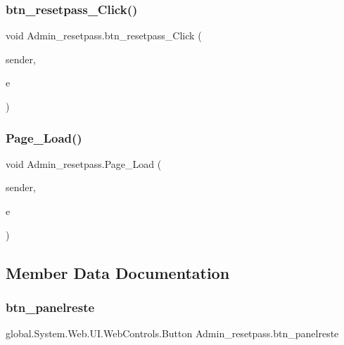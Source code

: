 \subsubsection{\texorpdfstring{btn\_resetpass\_Click()}{btn\_resetpass\_Click()}}
{\footnotesize\ttfamily void Admin\+\_\+resetpass.\+btn\+\_\+resetpass\+\_\+\+Click (\begin{DoxyParamCaption}\item[{object}]{sender,  }\item[{Event\+Args}]{e }\end{DoxyParamCaption})\hspace{0.3cm}{\ttfamily [protected]}}

\mbox{\label{class_admin__resetpass_a158be149b7919c7145f6ab7c6acb3ed6}} 
\subsubsection{\texorpdfstring{Page\_Load()}{Page\_Load()}}
{\footnotesize\ttfamily void Admin\+\_\+resetpass.\+Page\+\_\+\+Load (\begin{DoxyParamCaption}\item[{object}]{sender,  }\item[{Event\+Args}]{e }\end{DoxyParamCaption})\hspace{0.3cm}{\ttfamily [protected]}}



\subsection{Member Data Documentation}
\mbox{\label{class_admin__resetpass_a7d8f4a489fd14f3452824dd42b0f500c}} 
\subsubsection{\texorpdfstring{btn\_panelreste}{btn\_panelreste}}
{\footnotesize\ttfamily global.\+System.\+Web.\+U\+I.\+Web\+Controls.\+Button Admin\+\_\+resetpass.\+btn\+\_\+panelreste\hspace{0.3cm}{\ttfamily [protected]}}



